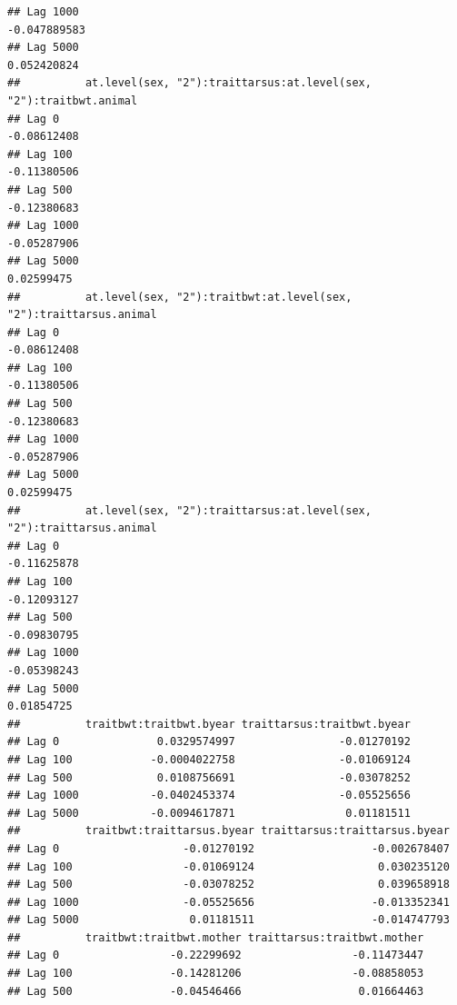 \documentclass[
  12pt,
]{book}
\begin{document}
\begin{verbatim}
## Lag 1000                                                   -0.047889583
## Lag 5000                                                    0.052420824
##          at.level(sex, "2"):traittarsus:at.level(sex, "2"):traitbwt.animal
## Lag 0                                                          -0.08612408
## Lag 100                                                        -0.11380506
## Lag 500                                                        -0.12380683
## Lag 1000                                                       -0.05287906
## Lag 5000                                                        0.02599475
##          at.level(sex, "2"):traitbwt:at.level(sex, "2"):traittarsus.animal
## Lag 0                                                          -0.08612408
## Lag 100                                                        -0.11380506
## Lag 500                                                        -0.12380683
## Lag 1000                                                       -0.05287906
## Lag 5000                                                        0.02599475
##          at.level(sex, "2"):traittarsus:at.level(sex, "2"):traittarsus.animal
## Lag 0                                                             -0.11625878
## Lag 100                                                           -0.12093127
## Lag 500                                                           -0.09830795
## Lag 1000                                                          -0.05398243
## Lag 5000                                                           0.01854725
##          traitbwt:traitbwt.byear traittarsus:traitbwt.byear
## Lag 0               0.0329574997                -0.01270192
## Lag 100            -0.0004022758                -0.01069124
## Lag 500             0.0108756691                -0.03078252
## Lag 1000           -0.0402453374                -0.05525656
## Lag 5000           -0.0094617871                 0.01181511
##          traitbwt:traittarsus.byear traittarsus:traittarsus.byear
## Lag 0                   -0.01270192                  -0.002678407
## Lag 100                 -0.01069124                   0.030235120
## Lag 500                 -0.03078252                   0.039658918
## Lag 1000                -0.05525656                  -0.013352341
## Lag 5000                 0.01181511                  -0.014747793
##          traitbwt:traitbwt.mother traittarsus:traitbwt.mother
## Lag 0                 -0.22299692                 -0.11473447
## Lag 100               -0.14281206                 -0.08858053
## Lag 500               -0.04546466                  0.01664463

\end{verbatim}
\end{document}
